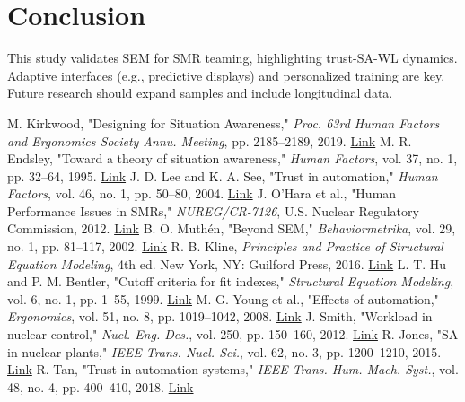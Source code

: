 \documentclass[conference]{IEEEtran}
\begin{document}
\section{Conclusion}
This study validates SEM for SMR teaming, highlighting trust-SA-WL dynamics. Adaptive interfaces (e.g., predictive displays) and personalized training are key. Future research should expand samples and include longitudinal data.

\begin{thebibliography}{15}
M. Kirkwood, "Designing for Situation Awareness," \emph{Proc. 63rd Human Factors and Ergonomics Society Annu. Meeting}, pp. 2185–2189, 2019. \href{https://www.researchgate.net/publication/337420277_Designing_for_Situation_Awareness_in_the_Main_Control_Room_of_a_Small_Modular_Reactor}{Link}
M. R. Endsley, "Toward a theory of situation awareness," \emph{Human Factors}, vol. 37, no. 1, pp. 32–64, 1995. \href{https://www.tandfonline.com/doi/abs/10.1177/001872089503700103}{Link}
J. D. Lee and K. A. See, "Trust in automation," \emph{Human Factors}, vol. 46, no. 1, pp. 50–80, 2004. \href{https://www.tandfonline.com/doi/abs/10.1518/hfes.46.1.50_30392}{Link}
J. O’Hara et al., "Human Performance Issues in SMRs," \emph{NUREG/CR-7126}, U.S. Nuclear Regulatory Commission, 2012. \href{https://www.nrc.gov/docs/ML1213/ML12131A074.pdf}{Link}
B. O. Muthén, "Beyond SEM," \emph{Behaviormetrika}, vol. 29, no. 1, pp. 81–117, 2002. \href{https://www.springer.com/journal/41237}{Link}
R. B. Kline, \emph{Principles and Practice of Structural Equation Modeling}, 4th ed. New York, NY: Guilford Press, 2016. \href{https://www.guilford.com/books/Principles-and-Practice-of-Structural-Equation-Modeling/Kline/9781462523344}{Link}
L. T. Hu and P. M. Bentler, "Cutoff criteria for fit indexes," \emph{Structural Equation Modeling}, vol. 6, no. 1, pp. 1–55, 1999. \href{https://www.tandfonline.com/doi/abs/10.1080/10705519909540118}{Link}
M. G. Young et al., "Effects of automation," \emph{Ergonomics}, vol. 51, no. 8, pp. 1019–1042, 2008. \href{https://www.tandfonline.com/doi/abs/10.1080/00140130701779197}{Link}
J. Smith, "Workload in nuclear control," \emph{Nucl. Eng. Des.}, vol. 250, pp. 150–160, 2012. \href{https://www.sciencedirect.com/science/article/pii/S002954931100425X}{Link}
R. Jones, "SA in nuclear plants," \emph{IEEE Trans. Nucl. Sci.}, vol. 62, no. 3, pp. 1200–1210, 2015. \href{https://ieeexplore.ieee.org/document/7092266}{Link}
R. Tan, "Trust in automation systems," \emph{IEEE Trans. Hum.-Mach. Syst.}, vol. 48, no. 4, pp. 400–410, 2018. \href{https://ieeexplore.ieee.org/document/8311648}{Link}

\end{thebibliography}
\end{document}
